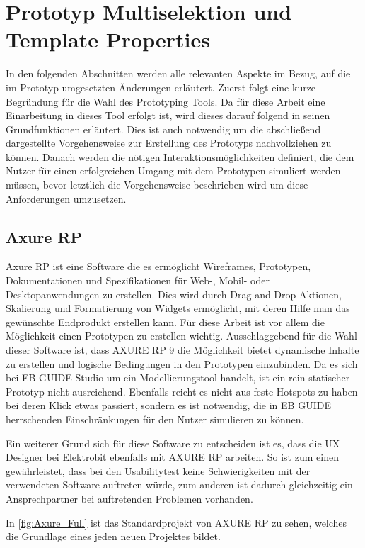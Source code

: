 \section {Prototyp Multiselektion und Template Properties}
In den folgenden Abschnitten werden alle relevanten Aspekte im Bezug, auf die im Prototyp umgesetzten Änderungen erläutert.
Zuerst folgt eine kurze Begründung für die Wahl des Prototyping Tools.
Da für diese Arbeit eine Einarbeitung in dieses Tool erfolgt ist, wird dieses darauf folgend in seinen Grundfunktionen erläutert.
Dies ist auch notwendig um die abschließend dargestellte Vorgehensweise zur Erstellung des Prototyps nachvollziehen zu können.
Danach werden die nötigen Interaktionsmöglichkeiten definiert, die dem Nutzer für einen erfolgreichen Umgang mit dem Prototypen simuliert werden müssen, bevor letztlich die Vorgehensweise beschrieben wird um diese Anforderungen umzusetzen.

\subsection {Axure RP}
Axure RP ist eine Software die es ermöglicht Wireframes, Prototypen, Dokumentationen und Spezifikationen für Web-, Mobil- oder Desktopanwendungen zu erstellen.
Dies wird durch Drag and Drop Aktionen, Skalierung und Formatierung von Widgets ermöglicht, mit deren Hilfe man das gewünschte Endprodukt erstellen kann.
Für diese Arbeit ist vor allem die Möglichkeit einen Prototypen zu erstellen wichtig.
Ausschlaggebend für die Wahl dieser Software ist, dass AXURE RP 9 die Möglichkeit bietet dynamische Inhalte zu erstellen und logische Bedingungen in den Prototypen einzubinden.
Da es sich bei EB GUIDE Studio um ein Modellierungstool handelt, ist ein rein statischer Prototyp nicht ausreichend.
Ebenfalls reicht es nicht aus feste Hotspots zu haben bei deren Klick etwas passiert, sondern es ist notwendig, die in EB GUIDE herrschenden Einschränkungen für den Nutzer simulieren zu können.

Ein weiterer Grund sich für diese Software zu entscheiden ist es, dass die UX Designer bei Elektrobit ebenfalls mit AXURE RP arbeiten.
So ist zum einen gewährleistet, dass bei den Usabilitytest keine Schwierigkeiten mit der verwendeten Software auftreten würde, zum anderen ist dadurch gleichzeitig ein Ansprechpartner bei auftretenden Problemen vorhanden.

In \cref{fig:Axure_Full} ist das Standardprojekt von AXURE RP zu sehen, welches die Grundlage eines jeden neuen Projektes bildet.

